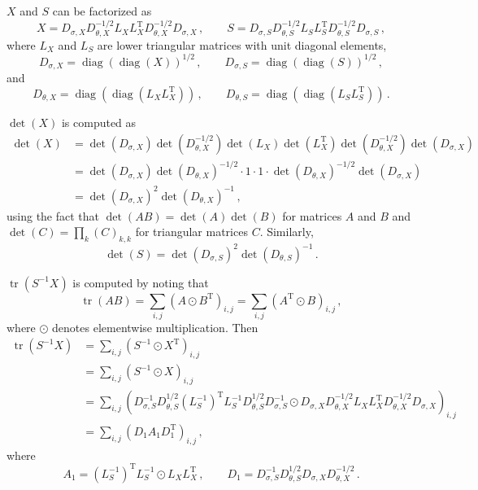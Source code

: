\documentclass[12pt]{article}
\DeclareMathOperator{\tr}{tr}
\DeclareMathOperator{\diag}{diag}
\newcommand{\transpose}[1]{#1^{\mathrm{T}}}
\begin{document}
$X$ and $S$ can be factorized as
\begin{equation}
X = D_{\sigma,X} D_{\theta,X}^{-1/2} L_{X} \transpose{L_{X}} D_{\theta,X}^{-1/2} D_{\sigma,X}\,,\qquad S = D_{\sigma,S} D_{\theta,S}^{-1/2} L_{S} \transpose{L_{S}} D_{\theta,S}^{-1/2} D_{\sigma,S}\,,
\end{equation}
where $L_{X}$ and $L_{S}$ are lower triangular matrices
with unit diagonal elements,
\begin{equation}
D_{\sigma,X} = \diag(\diag(X))^{1/2}\,,\qquad D_{\sigma,S} = \diag(\diag(S))^{1/2}\,,
\end{equation}
and
\begin{equation}
D_{\theta,X} = \diag(\diag(L_{X} \transpose{L_{X}}))\,,\qquad D_{\theta,S} = \diag(\diag(L_{S} \transpose{L_{S}}))\,.
\end{equation}

$\det(X)$ is computed as
\begin{equation}
\begin{aligned}
\det(X)
  &= \det(D_{\sigma,X}) \det(D_{\theta,X}^{-1/2}) \det(L_{X}) \det(\transpose{L_{X}}) \det(D_{\theta,X}^{-1/2}) \det(D_{\sigma,X}) \\
  &= \det(D_{\sigma,X}) \det(D_{\theta,X})^{-1/2} \cdot 1 \cdot 1 \cdot \det(D_{\theta,X})^{-1/2} \det(D_{\sigma,X}) \\
  &= \det(D_{\sigma,X})^{2} \det(D_{\theta,X})^{-1}\,,
\end{aligned}
\end{equation}
using the fact that
$\det(A B) = \det(A) \det(B)$ for matrices $A$ and $B$
and
$\det(C) = \prod_{k} (C)_{k,k}$ for triangular matrices $C$.
Similarly,
\begin{equation}
\det(S) = \det(D_{\sigma,S})^{2} \det(D_{\theta,S})^{-1}\,.
\end{equation}

$\tr(S^{-1} X)$ is computed by noting that
\begin{equation}
\tr(A B) = \sum_{i,j} (A \odot \transpose{B})_{i,j} = \sum_{i,j} (\transpose{A} \odot B)_{i,j}\,,
\end{equation}
where $\odot$ denotes elementwise multiplication. Then
\begin{equation}
\begin{aligned}
\tr(S^{-1} X)
  &= \sum_{i,j} (S^{-1} \odot \transpose{X})_{i,j} \\
  &= \sum_{i,j} (S^{-1} \odot X)_{i,j} \\
  &= \sum_{i,j} (D_{\sigma,S}^{-1} D_{\theta,S}^{1/2} \transpose{(L_{S}^{-1})} L_{S}^{-1} D_{\theta,S}^{1/2} D_{\sigma,S}^{-1} \odot D_{\sigma,X} D_{\theta,X}^{-1/2} L_{X} \transpose{L_{X}} D_{\theta,X}^{-1/2} D_{\sigma,X})_{i,j} \\
  &= \sum_{i,j} (D_{1} A_{1} \transpose{D_{1}})_{i,j}\,,
\end{aligned}
\end{equation}
where
\begin{equation}
A_{1} = \transpose{(L_{S}^{-1})} L_{S}^{-1} \odot L_{X} \transpose{L_{X}}\,,\qquad D_{1} = D_{\sigma,S}^{-1} D_{\theta,S}^{1/2} D_{\sigma,X} D_{\theta,X}^{-1/2}\,.
\end{equation}
\end{document}
